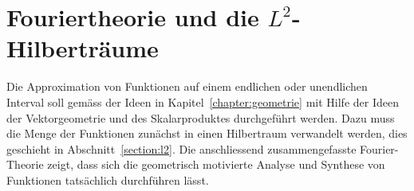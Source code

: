 %
%
%
\chapter{Fouriertheorie und die $L^2$-Hilberträume
\label{chapter:fourier}}
Die Approximation von Funktionen auf einem endlichen oder unendlichen
Interval soll gemäss der Ideen in Kapitel~\ref{chapter:geometrie}
mit Hilfe der Ideen der Vektorgeometrie und des Skalarproduktes
durchgeführt werden.
Dazu muss die Menge der Funktionen zunächst in einen Hilbertraum
verwandelt werden, dies geschieht in Abschnitt~\ref{section:l2}.
Die anschliessend zusammengefasste Fourier-Theorie zeigt, dass sich
die geometrisch motivierte Analyse und Synthese von Funktionen
tatsächlich durchführen lässt.






